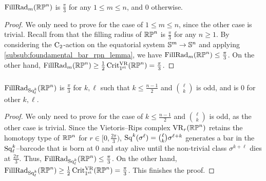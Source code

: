 \subsubsection{}
\label{subsub:beta_m_rpn}


\medskip\proposition
$\operatorname{FillRad}_{m}(\mathbb{RP}^n)$ is $\frac{\pi}{3}$ for any $1\leq m\leq n$, and $0$ otherwise.

\begin{proof}%
	We only need to prove for the case of $1\leq m\leq n$, since the other case is trivial.
    Recall from \cite{katz1983filling} that the filling radius of $\mathbb{RP}^n$ is $\frac{\pi}{3}$ for any $n \geq 1$.
	By considering the $\mathrm{C}_2$-action on the equatorial system $\mathbb{S}^m \to \mathbb{S}^n$ and applying \cref{subsub:foundamental_bar_rpn_lemma}, we have $\operatorname{FillRad}_{m}(\mathbb{RP}^n)\leq \tfrac{\pi}{3}$.
    On the other hand, $\operatorname{FillRad}_{m}(\mathbb{RP}^n)\geq \tfrac{1}{2}\operatorname{Crit^{\mathrm{VR}}_{1^{\mathrm{st}}}}(\mathbb{RP}^n) = \tfrac{\pi}{3}$.
\end{proof}

\subsubsection{}\label{subsub:gamma_rpn}

\medskip\proposition
$\operatorname{FillRad}_{\operatorname{Sq}_\ell^k}(\mathbb{RP}^n)$ is $\tfrac{\pi}{3}$ for $k, \ell$ such that $k \leq \frac{n-1}{2}$ and $\binom{\ell}{k}$ is odd, and is $0$ for other $k,\ell$.

\begin{proof}
	We only need to prove for the case of $k \leq \frac{n-1}{2}$ and $\binom{\ell}{k}$ is odd, as the other case is trivial.
    Since the Vietoris--Rips complex $\mathrm{VR}_r(\mathbb{RP}^n)$ retains the homotopy type of $\mathbb{RP}^n$ for $r \in [0,\tfrac{2\pi}{3})$, $\operatorname{Sq}^k(\sigma^\ell) = \binom{\ell}{k}\sigma^{\ell+k}$ generates a bar in the $\operatorname{Sq}^k_\ell$--barcode that is born at $0$ and stay alive until the non-trivial class $\sigma^{k+\ell}$ dies at $\tfrac{2\pi}{3}$.
	Thus, $\operatorname{FillRad}_{\operatorname{Sq}_\ell^k}(\mathbb{RP}^n) \leq \tfrac{\pi}{3}$.
	On the other hand, $\operatorname{FillRad}_{\operatorname{Sq}_\ell^k}(\mathbb{RP}^n) \geq \tfrac{1}{2}\operatorname{Crit^{\mathrm{VR}}_{1^{\mathrm{st}}}}(\mathbb{RP}^n) = \tfrac{\pi}{3}$.
    This finishes the proof.
\end{proof}

\subsubsection{}\label{sub:barcode_rpn}

